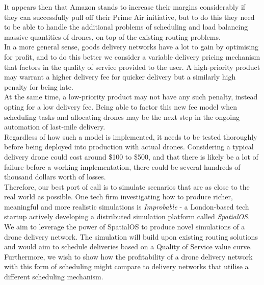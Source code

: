 \documentclass[a4paper,11pt,titlepage]{report}
\begin{document}
It appears then that Amazon stands to increase their margins considerably if they can successfully pull off their Prime Air initiative\cite{Welch2015}, but to do this they need to be able to handle the additional problems of scheduling and load balancing massive quantities of drones, on top of the existing routing problems. \\

In a more general sense, goods delivery networks have a lot to gain by optimising for profit, and to do this better we consider a variable delivery pricing mechanism that factors in the quality of service provided to the user. A high-priority product may warrant a higher delivery fee for quicker delivery but a similarly high penalty for being late.\\

At the same time, a low-priority product may not have any such penalty, instead opting for a low delivery fee. Being able to factor this new fee model when scheduling tasks and allocating drones may be the next step in the ongoing automation of last-mile delivery\cite{Joerss2016}.\\

Regardless of how such a model is implemented, it needs to be tested thoroughly before being deployed into production with actual drones. Considering a typical delivery drone could cost around \$100 to \$500\cite{Menon2013}, and that there is likely be a lot of failure before a working implementation, there could be several hundreds of thousand dollars worth of losses. \\

Therefore, our best port of call is to simulate scenarios that are as close to the real world as possible. One tech firm investigating how to produce richer, meaningful and more realistic simulations is \textit{Improbable}\cite{ImprobableWorldsLtd.2018a} - a London-based tech startup actively developing a distributed simulation platform called \textit{SpatialOS}\cite{ImprobableWorldsLtd.2018b}. \\

We aim to leverage the power of SpatialOS to produce novel simulations of a drone delivery network. The simulation will build upon existing routing solutions\cite{Balaji2017} and would aim to schedule deliveries based on a Quality of Service value curve. Furthermore, we wish to show how the profitability of a drone delivery network with this form of scheduling might compare to delivery networks that utilise a different scheduling mechanism.
\end{document}
